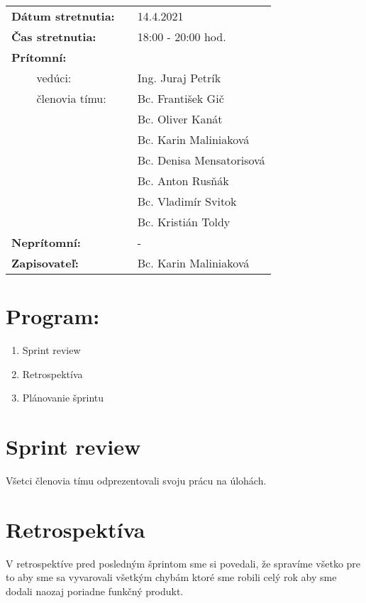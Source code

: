\documentclass{article}
\begin{document}
    

    \begin{table}[h]
        \begin{tabular}{lllll}
            \multicolumn{3}{l}{\textbf{Dátum stretnutia:}} & & 14.4.2021 \\
            \multicolumn{3}{l}{\textbf{Čas stretnutia:}} & & 18:00 - 20:00 hod. \\
            \multicolumn{3}{l}{\textbf{Prítomní:}} \\
            & & vedúci: & & Ing. Juraj Petrík \\
            & & členovia tímu: & & Bc. František Gič  \\
            & & & & Bc. Oliver Kanát \\
            & & & & Bc. Karin Maliniaková \\
            & & & & Bc. Denisa Mensatorisová \\
            & & & & Bc. Anton Rusňák \\
            & & & & Bc. Vladimír Svitok \\
            & & & & Bc. Kristián Toldy \\
            \multicolumn{3}{l}{\textbf{Neprítomní:}} & & -\\
            \multicolumn{3}{l}{\textbf{Zapisovateľ:}} & & Bc. Karin Maliniaková \\
        \end{tabular}
        \label{tab:grades}
    \end{table}

    \section*{Program:}

    \begin{enumerate}
        \item Sprint review
        \item Retrospektíva
        \item Plánovanie šprintu
    \end{enumerate}

    \section*{Sprint review}

        \textnormal {Všetci členovia tímu odprezentovali svoju prácu na úlohách.}


    \section*{Retrospektíva}
        \textnormal {V retrospektíve pred posledným šprintom sme si povedali, že spravíme všetko pre to aby sme sa vyvarovali všetkým chybám ktoré sme robili celý rok aby sme dodali naozaj poriadne funkčný produkt. }
        
\end{document}
